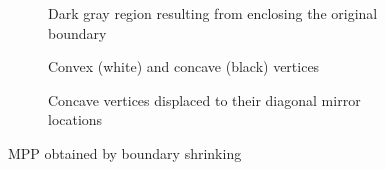 \begin{figure}[h]
	\centering
	\begin{subfigure}[b]{0.3\textwidth}
		\centering
		\caption{Dark gray region resulting from enclosing the original boundary}
	\end{subfigure}
	\begin{subfigure}[b]{0.3\textwidth}
		\centering
		\caption{Convex (white) and concave (black) vertices}
	\end{subfigure}
	\begin{subfigure}[b]{0.3\textwidth}
		\centering
		\caption{Concave vertices displaced to their diagonal mirror locations}
	\end{subfigure}
	\caption{MPP obtained by boundary shrinking}
\end{figure}

